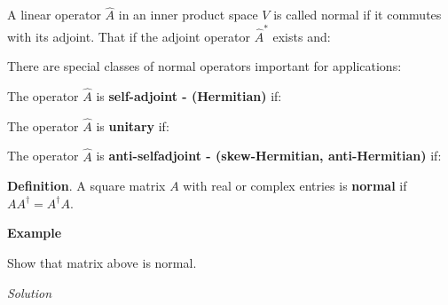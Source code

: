 \documentclass{article}
\begin{document}
A linear operator $\hat{A}$ in an inner product space $V$ is called normal if it commutes with its adjoint. That if the adjoint operator $\hat{A}^*$ exists and:


There are special classes of normal operators important for applications:

The operator $\hat{A}$ is \textbf{self-adjoint - (Hermitian)} if:


The operator $\hat{A}$ is \textbf{unitary} if:



The operator $\hat{A}$ is \textbf{anti-selfadjoint - (skew-Hermitian, anti-Hermitian)} if:




\textbf{Definition}. A square matrix $A$ with real or complex entries is \textbf{normal} if $AA^\dag = A^\dag A$.

\textbf{Example}


Show that matrix above is normal.

\textit{Solution}



\end{document}
